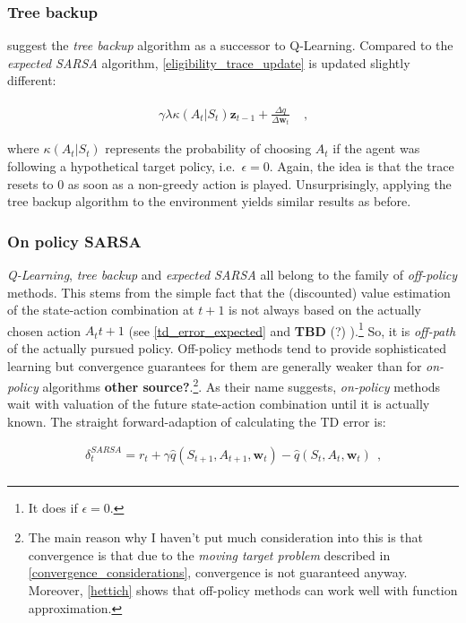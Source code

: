 \subsubsection{Tree backup}

\textcite{precup} suggest the \emph{tree backup} algorithm as a successor to Q-Learning. Compared to the \emph{expected SARSA} algorithm, \autoref{eligibility_trace_update} is updated slightly different:

\begin{gather}\label{eligibility_traces_tree_backup}
\gamma \lambda \kappa(A_t | S_t) \boldsymbol{z}_{t-1} + \frac{\Delta \hat{q}}{\Delta \boldsymbol{w}_t} ~~~~~ \text{,}
\end{gather}

where $\kappa(A_t | S_t)$ represents the probability of choosing $A_t$ if the agent was following a hypothetical target policy, i.e.\ $\epsilon= 0$. Again, the idea is that the trace resets to 0 as soon as a non-greedy action is played. Unsurprisingly, applying the tree backup algorithm to the environment yields similar results as before.

\subsubsection{On policy SARSA}
\emph{Q-Learning}, \emph{tree backup} and \emph{expected SARSA} all belong to the family of \emph{off-policy} methods. This stems from the simple fact that the (discounted) value estimation of the state-action combination at $t+1$ is not always based on the actually chosen action $A_t{t+1}$ (see \autoref{td_error_expected} and \textbf{TBD} (?) ).\footnote{It does if $\epsilon = 0$.}  So, it is \emph{off-path} of the actually pursued policy. Off-policy methods tend to provide sophisticated learning but convergence guarantees for them are generally weaker than for \emph{on-policy} algorithms \parencite{sutton_reinforcement_2018} \textbf{other source?}.\footnote{The main reason why I haven't put much consideration into this is that convergence is that due to the \emph{moving target problem} described in \autoref{convergence_considerations}, convergence is not guaranteed anyway. Moreover, \autoref{hettich} shows that off-policy methods can work well with function approximation.}. As their name suggests, \emph{on-policy} methods wait with valuation of the future state-action combination until it is actually known. The straight forward-adaption of calculating the TD error is:

\begin{gather}\label{td_error_on_policy}
\delta_t^{SARSA} = r_t + \gamma \hat{q}(S_{t+1}, A_{t+1}, \boldsymbol{w}_t) - \hat{q}(S_t, A_t, \boldsymbol{w}_t) ~~ \text{,} \\
\end{gather}

